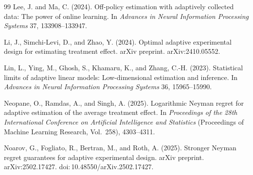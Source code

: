 \documentclass[11pt]{article}
\numberwithin{equation}{section}
\theoremstyle{plain}
\theoremstyle{definition}
\theoremstyle{remark}
\newcommand{\doi}[1]{doi:\,#1}
\newcommand{\arxiv}[1]{arXiv:#1}
\begin{document}
\begin{thebibliography}{99}
Lee, J. and Ma, C. (2024).
Off-policy estimation with adaptively collected data: The power of online learning.
In \emph{Advances in Neural Information Processing Systems} 37, 133908--133947.

Li, J., Simchi-Levi, D., and Zhao, Y. (2024).
Optimal adaptive experimental design for estimating treatment effect.
arXiv preprint. \arxiv{2410.05552}.

Lin, L., Ying, M., Ghosh, S., Khamaru, K., and Zhang, C.-H. (2023).
Statistical limits of adaptive linear models: Low-dimensional estimation and inference.
In \emph{Advances in Neural Information Processing Systems} 36, 15965--15990.

Neopane, O., Ramdas, A., and Singh, A. (2025).
Logarithmic Neyman regret for adaptive estimation of the average treatment effect.
In \emph{Proceedings of the 28th International Conference on Artificial Intelligence and Statistics} (Proceedings of Machine Learning Research, Vol.~258), 4303--4311.

Noarov, G., Fogliato, R., Bertran, M., and Roth, A. (2025).
Stronger Neyman regret guarantees for adaptive experimental design.
arXiv preprint. \arxiv{2502.17427}. \doi{10.48550/arXiv.2502.17427}.

\end{thebibliography}
\end{document}
